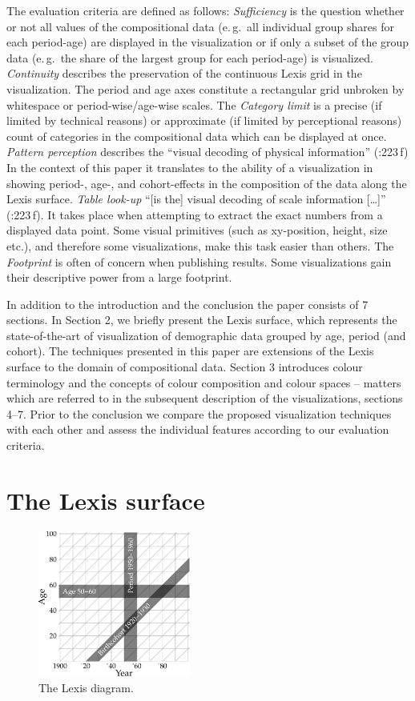 \documentclass[a4paper]{scrartcl}
\begin{document}
The evaluation criteria are defined as follows:
\emph{Sufficiency} is the question whether or not all values of the compositional data (e.\,g.~all individual group shares for each period-age) are displayed in the visualization or if only a subset of the group data (e.\,g.~the share of the largest group for each period-age) is visualized.
\emph{Continuity} describes the preservation of the continuous Lexis grid in the visualization. The period and age axes constitute a rectangular grid unbroken by whitespace or period-wise/age-wise scales.
The \emph{Category limit} is a precise (if limited by technical reasons) or approximate (if limited by perceptional reasons) count of categories in the compositional data which can be displayed at once.
\emph{Pattern perception} describes the \enquote{visual decoding of physical information} (\cite{Cleveland1994}:223\,f) In the context of this paper it translates to the ability of a visualization in showing period-, age-, and cohort-effects in the composition of the data along the Lexis surface.
\emph{Table look-up} \enquote{[is the] visual decoding of scale information [\ldots]} (\cite{Cleveland1994}:223\,f). It takes place when attempting to extract the exact numbers from a displayed data point. Some visual primitives (such as xy-position, height, size etc.), and therefore some visualizations, make this task easier than others.
The \emph{Footprint} is often of concern when publishing results. Some visualizations gain their descriptive power from a large footprint.

In addition to the introduction and the conclusion the paper consists of 7 sections. In Section 2, we briefly present the Lexis surface, which represents the state-of-the-art of visualization of demographic data grouped by age, period (and cohort). The techniques presented in this paper are extensions of the Lexis surface to the domain of compositional data. Section 3 introduces colour terminology and the concepts of colour composition and colour spaces -- matters which are referred to in the subsequent description of the visualizations, sections 4--7. Prior to the conclusion we compare the proposed visualization techniques with each other and assess the individual features according to our evaluation criteria.

\section*{The Lexis surface}

\begin{figure}
  \centering
  \includegraphics[width = 5cm]{../fig/plot-lexis_exmpl.pdf}
  \caption{The Lexis diagram.}
  \label{fig:lexis_example}
\end{figure}
\end{document}
